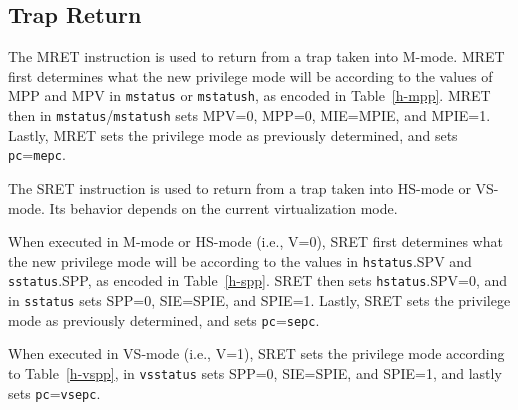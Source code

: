 \subsection{Trap Return}

The MRET instruction is used to return from a trap taken into M-mode.
MRET first determines what the new privilege mode will be according to
the values of MPP and MPV in {\tt mstatus} or {\tt mstatush}, as encoded in
Table~\ref{h-mpp}.
MRET then in {\tt mstatus}/{\tt mstatush} sets MPV=0, MPP=0, MIE=MPIE, and MPIE=1.
Lastly, MRET sets the privilege mode as previously
determined, and sets {\tt pc}={\tt mepc}.

The SRET instruction is used to return from a trap taken into HS-mode or
VS-mode.  Its behavior depends on the current virtualization mode.

When executed in M-mode or HS-mode (i.e., V=0), SRET first determines
what the new privilege mode will be according to the values in
{\tt hstatus}.SPV and {\tt sstatus}.SPP, as encoded in Table~\ref{h-spp}.
SRET then sets {\tt hstatus}.SPV=0, and in {\tt sstatus} sets SPP=0,
SIE=SPIE, and SPIE=1.
Lastly, SRET sets the privilege mode as previously
determined, and sets {\tt pc}={\tt sepc}.

When executed in VS-mode (i.e., V=1), SRET sets the privilege mode according to
Table~\ref{h-vspp}, in {\tt vsstatus} sets SPP=0, SIE=SPIE, and SPIE=1, and
lastly sets {\tt pc}={\tt vsepc}.
